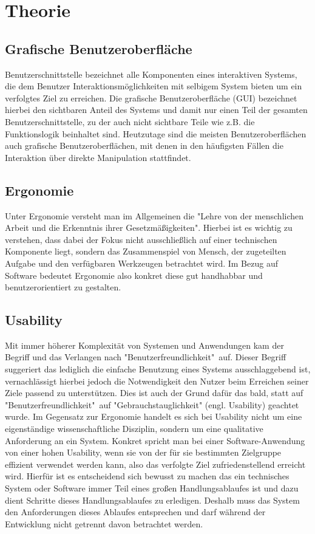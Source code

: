 \chapter{Theorie}\label{ch:data}

\section{Grafische Benutzeroberfläche}
Benutzerschnittstelle bezeichnet alle Komponenten eines interaktiven Systems, die dem Benutzer Interaktionsmöglichkeiten mit selbigem System bieten um ein verfolgtes Ziel zu erreichen.
Die grafische Benutzeroberfläche (GUI) bezeichnet hierbei den sichtbaren Anteil des Systems und damit nur einen Teil der gesamten Benutzerschnittstelle, zu der auch nicht sichtbare Teile wie z.B. die Funktionslogik beinhaltet sind.\cite{Sarodnick.2016}
Heutzutage sind die meisten Benutzeroberflächen auch grafische Benutzeroberflächen, mit denen in den häufigsten Fällen die Interaktion  über direkte Manipulation stattfindet.\cite{Nielsen.1995?}

\section{Ergonomie}
Unter Ergonomie versteht man im Allgemeinen die "Lehre von der menschlichen Arbeit und die Erkenntnis ihrer Gesetzmäßigkeiten"\cite{https:www.facebook.comArbeitsplatzergonomie.2014}.
Hierbei ist es wichtig zu verstehen, dass dabei der Fokus nicht ausschließlich auf einer technischen Komponente liegt, sondern das Zusammenspiel von Mensch, der zugeteilten Aufgabe und den verfügbaren Werkzeugen betrachtet wird\cite{Sarodnick.2016}.
Im Bezug auf Software bedeutet Ergonomie also konkret diese gut handhabbar und benutzerorientiert zu gestalten.

\section{Usability}
Mit immer höherer Komplexität von Systemen und Anwendungen kam der Begriff und das Verlangen nach  "Benutzerfreundlichkeit"\ auf.
Dieser Begriff suggeriert das lediglich die einfache Benutzung eines Systems ausschlaggebend ist, vernachlässigt hierbei jedoch die Notwendigkeit den Nutzer beim Erreichen seiner Ziele passend zu unterstützen.
Dies ist auch der Grund dafür das bald, statt auf "Benutzerfreundlichkeit"\ auf "Gebrauchstauglichkeit" (engl. Usability) geachtet wurde.
Im Gegensatz zur Ergonomie handelt es sich bei Usability nicht um eine eigenständige wissenschaftliche Disziplin, sondern um eine qualitative Anforderung an ein System\cite{Sarodnick.2016}.
Konkret spricht man bei einer Software-Anwendung von einer hohen Usability, wenn sie von der für sie bestimmten Zielgruppe effizient verwendet werden kann, also das verfolgte Ziel zufriedenstellend erreicht wird\cite{Richter.2016}.
Hierfür ist es entscheidend sich bewusst zu machen das ein technisches System oder Software immer Teil eines großen Handlungsablaufes ist und dazu dient Schritte dieses Handlungsablaufes zu erledigen.
Deshalb muss das System den Anforderungen dieses Ablaufes entsprechen und darf während der Entwicklung nicht getrennt davon betrachtet werden\cite{Sarodnick.2016}.


